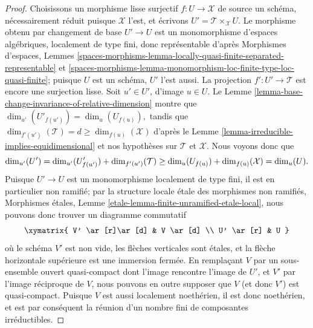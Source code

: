 \begin{proof}
Choisissons un morphisme lisse surjectif $f:U \to \mathcal{X}$ de source un schéma,
nécessairement réduit puisque $\mathcal{X}$ l'est,
et écrivons $U' = \mathcal{T}\times_{\mathcal{X}} U$. Le morphisme obtenu par changement de base
$U' \to U$ est un monomorphisme d'espaces algébriques, localement de type
fini, donc représentable d'après
Morphismes d'espaces, Lemmes
\ref{spaces-morphisms-lemma-locally-quasi-finite-separated-representable} et
\ref{spaces-morphisms-lemma-monomorphism-loc-finite-type-loc-quasi-finite};
puisque $U$ est un schéma, $U'$ l'est aussi.
La projection $f': U' \to \mathcal{T}$ est encore une surjection lisse.
Soit $u' \in U'$, d'image $u \in U$.
Le Lemme \ref{lemma-base-change-invariance-of-relative-dimension}
montre que $\dim_{u'}(U'_{f(u')}) = \dim_u(U_{f(u)}),$
tandis que $\dim_{f'(u')}(\mathcal{T}) =d
\geq \dim_{f(u)}(\mathcal{X})$ d'après le
Lemme \ref{lemma-irreducible-implies-equidimensional}
et nos hypothèses sur $\mathcal{T}$ et $\mathcal{X}$.
Nous voyons donc que
\begin{equation}
\label{equation-dim-inequality}
\dim_{u'} (U') = \dim_{u'} (U'_{f(u')}) + \dim_{f'(u')}(\mathcal{T})
\\
\geq \dim_u (U_{f(u)}) + \dim_{f(u)}(\mathcal{X}) = \dim_u (U).
\end{equation}
Puisque $U' \to U$ est un monomorphisme localement de type fini,
il est en particulier non ramifié;
par la structure locale étale des morphismes non ramifiés,
Morphismes étales, Lemme \ref{etale-lemma-finite-unramified-etale-local},
nous pouvons donc trouver un diagramme commutatif
$$
\xymatrix{
V' \ar[r]\ar[d] & V \ar[d] \\
U' \ar[r] & U
}
$$
où le schéma $V'$ est non vide,
les flèches verticales sont étales,
et la flèche horizontale supérieure est une immersion fermée.
En remplaçant $V$ par un sous-ensemble ouvert quasi-compact
dont l'image rencontre l'image de $U'$,
et $V'$ par l'image réciproque de $V$, nous pouvons en outre
supposer que $V$ (et donc $V'$) est quasi-compact.
Puisque $V$ est aussi localement noethérien,
il est donc noethérien, et est par conséquent la réunion d'un nombre fini de composantes
irréductibles.


\end{proof}

